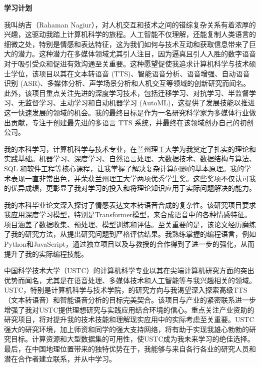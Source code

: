 \documentclass[12pt,a4paper]{article}
\begin{document}
\begin{CJK*}{UTF8}{gbsn}
    \thispagestyle{plain}

    \fontsize{14}{16}\selectfont

\begin{center}

    \Huge{ \bfseries{ 学习计划}}



    \vspace*{1cm}

    
\end{center}



\onehalfspacing


我叫纳吉（Rahaman Nagiur），对人机交互和技术之间的错综复杂关系有着浓厚的兴趣，这驱动我踏上计算机科学的旅程。人工智能不仅理解，还能复制人类语言的细微之处，特别是情感和表达特征，这为我们如何与技术互动和获取信息带来了巨大的潜力。这种潜力在多媒体领域尤其引人注目，因为逼真且引人入胜的数字语音对于吸引受众和促进有效沟通至关重要。这种愿望促使我追求计算机科学与技术硕士学位，该项目以其在文本转语音 (TTS)、智能语音分析、语音增强、自动语音识别 (ASR)、多媒体分析、声学场景分析和人机交互等领域的创新研究而闻名。此外，该项目重点关注先进的深度学习技术，包括迁移学习、对抗学习、半监督学习、无监督学习、主动学习和自动机器学习 (AutoML)，这提供了发展技能以推进这一快速发展的领域的机会。我的最终目标是作为一名研究科学家为多媒体行业做出贡献，专注于创建最先进的多语言 TTS 系统，并最终在该领域创办自己的初创公司。\newline

我的本科学习，计算机科学与技术专业，在兰州理工大学为我奠定了扎实的理论和实践基础。机器学习、深度学习、自然语言处理、大数据技术、数据结构与算法、SQL 和软件工程等核心课程，让我掌握了解决复杂计算问题的基本原理。我的学术表现一直非常出色，并荣获兰州理工大学两项优秀学生奖。这些奖项不仅认可我的优异成绩，更彰显了我对学习的投入和将理论知识应用于实际问题解决的能力。\newline

 我的本科毕业论文深入探讨了情感表达文本转语音合成的复杂性。该研究项目要求我应用深度学习模型，特别是Transformer模型，来合成语音中的各种情感特征。项目涵盖了数据收集、预处理、模型训练和评估。至关重要的是，该论文经历磨练了我的研究方法，从提出研究问题到严格评估结果。我熟练掌握的编程语言，例如Python和JavaScript，通过独立项目以及与教授的合作得到了进一步的强化，从而提升了我的实际编程技能。\newline

中国科学技术大学（USTC）的计算机科学专业以其在尖端计算机研究方面的突出优势而闻名，尤其是在语音处理、多媒体技术和人工智能等与我兴趣相关的领域。USTC，特别是计算机科学与技术学院，的研究方向与我渴望深入探索高级TTS（文本转语音）和智能语音分析的目标完美契合。该项目与产业的紧密联系进一步增强了我对USTC提供理想研究与实践应用结合环境的信心。重点关注产业资助的研究项目，将对提升我的技术技能和理解现实应用中的实际考虑至关重要。USTC强大的研究环境，加上师资和同学的强大支持网络，将有助于实现我雄心勃勃的研究目标。计算资源和大型数据集的可用性，使USTC成为我未来学习的绝佳选择。最后，在中国地理位置带来的独特优势在于，我能够与来自各行各业的研究人员和潜在合作者建立联系，并从中学习。\newline


\end{CJK*}
\end{document}
